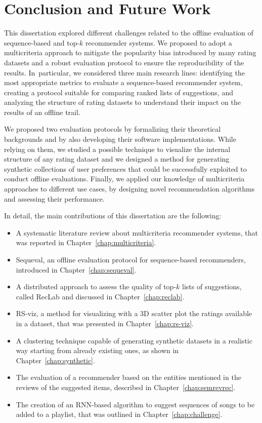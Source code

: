 \chapter{Conclusion and Future Work}
\label{chap:conclusion}

This dissertation explored different challenges related to the offline evaluation of sequence-based and top-$k$ recommender systems. We proposed to adopt a multicriteria approach to mitigate the popularity bias introduced by many rating datasets and a robust evaluation protocol to ensure the reproducibility of the results. In~particular, we considered three main research lines: identifying the most appropriate metrics to evaluate a sequence-based recommender system, creating a protocol suitable for comparing ranked lists of suggestions, and analyzing the structure of rating datasets to understand their impact on the results of an offline trail.

We proposed two evaluation protocols by formalizing their theoretical backgrounds and by also developing their software implementations. While relying on them, we studied a possible technique to visualize the internal structure of any rating dataset and we designed a method for generating synthetic collections of user preferences that could be successfully exploited to conduct offline evaluations. Finally, we applied our knowledge of multicriteria approaches to different use cases, by designing novel recommendation algorithms and assessing their performance.

In detail, the main contributions of this dissertation are the following:

\begin{itemize}
\item A systematic literature review about multicriteria recommender systems, that was reported in Chapter~\ref{chap:multicriteria}.
\item Sequeval, an offline evaluation protocol for sequence-based recommenders, introduced in Chapter~\ref{chap:sequeval}.
\item A distributed approach to assess the quality of top-$k$ lists of suggestions, called RecLab and discussed in Chapter~\ref{chap:reclab}.
\item RS-viz, a method for visualizing with a 3D scatter plot the ratings available in a dataset, that was presented in Chapter~\ref{chap:rs-viz}.
\item A clustering technique capable of generating synthetic datasets in a realistic way starting from already existing ones, as shown in Chapter~\ref{chap:synthetic}.
\item The evaluation of a recommender based on the entities mentioned in the reviews of the suggested items, described in Chapter~\ref{chap:semrevrec}.
\item The creation of an RNN-based algorithm to suggest sequences of songs to be added to a playlist, that was outlined in Chapter~\ref{chap:challenge}.
\end{itemize}

